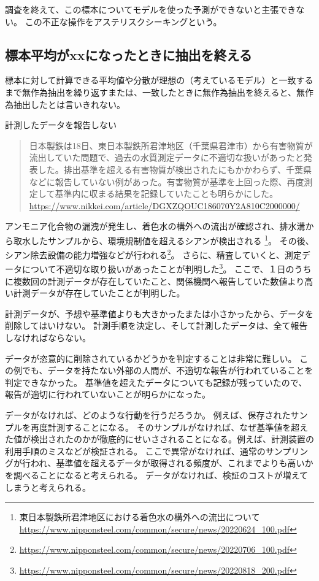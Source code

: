 調査を終えて、この標本についてモデルを使った予測ができないと主張できない。
この不正な操作をアステリスクシーキングという。


\subsection{標本平均がxxになったときに抽出を終える}
標本に対して計算できる平均値や分散が理想の（考えているモデル）と一致するまで無作為抽出を繰り返すまたは、一致したときに無作為抽出を終えると、無作為抽出したとは言いきれない。


\begin{SMbox}{計測したデータを報告しない}
    \begin{quote}
        日本製鉄は18日、東日本製鉄所君津地区（千葉県君津市）から有害物質が流出していた問題で、過去の水質測定データに不適切な扱いがあったと発表した。排出基準を超える有害物質が検出されたにもかかわらず、千葉県などに報告していない例があった。有害物質が基準を上回った際、再度測定して基準内に収まる結果を記録していたことも明らかにした。
        \ \ \\ \url{https://www.nikkei.com/article/DGXZQOUC186070Y2A810C2000000/}
    \end{quote}

    アンモニア化合物の漏洩が発生し、着色水の構外への流出が確認され、排水溝から取水したサンプルから、環境規制値を超えるシアンが検出される   \footnote{東日本製鉄所君津地区における着色水の構外への流出について \url{https://www.nipponsteel.com/common/secure/news/20220624_100.pdf}}。
    その後、シアン除去設備の能力増強などが行われる\footnote{\url{https://www.nipponsteel.com/common/secure/news/20220706_100.pdf}}。
    さらに、精査していくと、測定データについて不適切な取り扱いがあったことが判明した\footnote{\url{https://www.nipponsteel.com/common/secure/news/20220818_200.pdf}}。
    ここで、１日のうちに複数回の計測データが存在していたこと、関係機関へ報告していた数値より高い計測データが存在していたことが判明した。

    計測データが、予想や基準値よりも大きかったまたは小さかったから、データを削除してはいけない。
    計測手順を決定し、そして計測したデータは、全て報告しなければならない。

    データが恣意的に削除されているかどうかを判定することは非常に難しい。
    この例でも、データを持たない外部の人間が、不適切な報告が行われていることを判定できなかった。
    基準値を超えたデータについても記録が残っていたので、報告が適切に行われていないことが明らかになった。


    データがなければ、どのような行動を行うだろうか。
    例えば、保存されたサンプルを再度計測することになる。
    そのサンプルがなければ、なぜ基準値を超えた値が検出されたのかが徹底的にせいさされることになる。例えば、計測装置の利用手順のミスなどが検証される。
    ここで異常がなければ、通常のサンプリングが行われ、基準値を超えるデータが取得される頻度が、これまでよりも高いかを調べることになると考えられる。
    データがなければ、検証のコストが増えてしまうと考えられる。

    

\end{SMbox}

